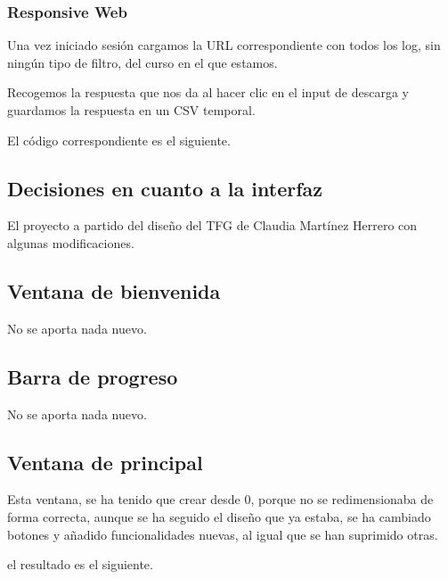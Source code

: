 
\subsubsection{Responsive Web}\label{responsive-web}

Una vez iniciado sesión cargamos la URL correspondiente con todos los log, sin ningún tipo de filtro, del curso en el que estamos.

Recogemos la respuesta que nos da al hacer clic en el input de descarga y guardamos la respuesta en un CSV temporal.

El código correspondiente es el siguiente.



\subsection{Decisiones en cuanto a la interfaz}\label{decisiones-en-cuanto-a-la-interfaz}

El proyecto a partido del diseño del TFG de Claudia Martínez Herrero \cite{claudia} con algunas modificaciones.

\subsection{Ventana de bienvenida}\label{ventana-de-bienvenida}

No se aporta nada nuevo.

\subsection{Barra de progreso}\label{barra-de-progreso}

No se aporta nada nuevo.

\subsection{Ventana de principal}\label{ventana-de-principal}

Esta ventana, se ha tenido que crear desde 0, porque no se redimensionaba de forma correcta, aunque se ha seguido el diseño que ya estaba, se ha cambiado botones y añadido funcionalidades nuevas, al igual que se han suprimido otras. 

el resultado es el siguiente.


